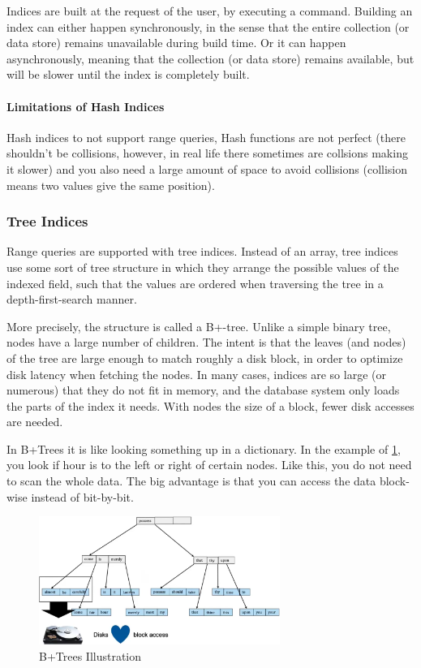 Indices are built at the request of the user, by executing a command. Building an index can either happen synchronously, in the sense that the entire collection (or data store) remains unavailable during build time. Or it can happen asynchronously, meaning that the collection (or data store) remains available, but will be slower until the index is completely built.

\paragraph{Limitations of Hash Indices}

Hash indices to not support range queries, Hash functions are not perfect (there shouldn't be collisions, however, in real life there sometimes are collsions making it slower) and you also need a large amount of space to avoid collisions (collision means two values give the same position).

\subsubsection{Tree Indices}

Range queries are supported with tree indices. Instead of an array, tree indices use some sort of tree structure in which they arrange the possible values of the indexed field, such that the values are ordered when traversing the tree in a depth-first-search manner.

More precisely, the structure is called a B+-tree. Unlike a simple binary tree, nodes have a large number of children. The intent is that the leaves (and nodes) of the tree are large enough to match roughly a disk block, in order to optimize disk latency when fetching the nodes. In many cases, indices are so large (or numerous) that they do not fit in memory, and the database system only loads the parts of the index it needs. With nodes the size of a block, fewer disk accesses are needed.

In B+Trees it is like looking something up in a dictionary. In the example of \cref{fig:BTrees}, you look if hour is to the left or right of certain nodes. Like this, you do not need to scan the whole data. The big advantage is that you can access the data block-wise instead of bit-by-bit.

\begin{figure}[h]
    \centering
    \includegraphics[width=0.7\textwidth]{Figures/B+Trees.png}
    \caption{B+Trees Illustration}\label{fig:BTrees}
\end{figure}

